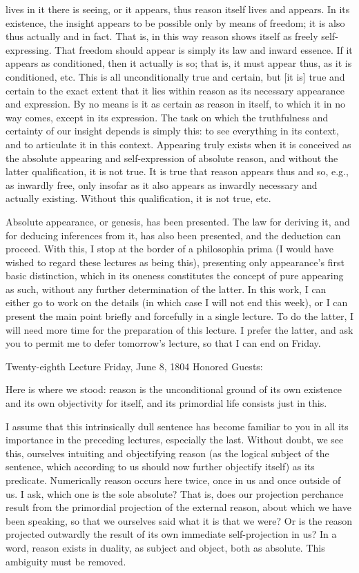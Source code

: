 lives in it there is seeing,
or it appears, thus reason itself lives and appears.
In its existence, the insight appears
to be possible only by means of freedom;
it is also thus actually and in fact.
That is, in this way reason shows itself
as freely self-expressing.
That freedom should appear is
simply its law and inward essence.
If it appears as conditioned, then it actually is so;
that is, it must appear thus, as it is conditioned, etc.
This is all unconditionally true and certain,
but [it is] true and certain to the exact extent
that it lies within reason
as its necessary appearance and expression.
By no means is it as certain as reason in itself,
to which it in no way comes, except in its expression.
The task on which the truthfulness and certainty
of our insight depends is simply this:
to see everything in its context,
and to articulate it in this context.
Appearing truly exists
when it is conceived
as the absolute appearing
and self-expression of absolute reason,
and without the latter qualification,
it is not true.
It is true that reason appears thus and so,
e.g., as inwardly free,
only insofar as it also appears
as inwardly necessary and actually existing.
Without this qualification, it is not true, etc.

Absolute appearance, or genesis,
has been presented.
The law for deriving it,
and for deducing inferences from it,
has also been presented,
and the deduction can proceed.
With this, I stop at the border
of a philosophia prima
(I would have wished to regard
these lectures as being this),
presenting only appearance's
first basic distinction,
which in its oneness constitutes
the concept of pure appearing as such,
without any further determination of the latter.
In this work, I can either go to work on the details
(in which case I will not end this week),
or I can present the main point
briefly and forcefully
in a single lecture.
To do the latter, I will need more time
for the preparation of this lecture.
I prefer the latter, and ask you to
permit me to defer tomorrow's lecture,
so that I can end on Friday.

Twenty-eighth Lecture
Friday, June 8, 1804
Honored Guests:

Here is where we stood:
reason is the unconditional ground of its own existence
and its own objectivity for itself,
and its primordial life consists just in this.

I assume that this intrinsically dull sentence has
become familiar to you in all its importance
in the preceding lectures, especially the last.
Without doubt, we see this,
ourselves intuiting and objectifying reason
(as the logical subject of the sentence,
which according to us should now
further objectify itself)
as its predicate.
Numerically reason occurs here twice,
once in us and once outside of us.
I ask, which one is the sole absolute?
That is, does our projection perchance result
from the primordial projection of the external reason,
about which we have been speaking,
so that we ourselves said what it is that we were?
Or is the reason projected outwardly the result
of its own immediate self-projection in us?
In a word, reason exists in duality,
as subject and object,
both as absolute.
This ambiguity must be removed.

